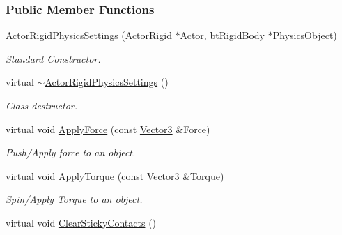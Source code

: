 \subsubsection*{Public Member Functions}
\begin{DoxyCompactItemize}
\item 
\hyperlink{classMezzanine_1_1ActorRigidPhysicsSettings_a01aac76583a043e4917546ab6fabe160}{Actor\-Rigid\-Physics\-Settings} (\hyperlink{classMezzanine_1_1ActorRigid}{Actor\-Rigid} $\ast$Actor, bt\-Rigid\-Body $\ast$Physics\-Object)
\begin{DoxyCompactList}\small\item\em Standard Constructor. \end{DoxyCompactList}\item 
virtual \hyperlink{classMezzanine_1_1ActorRigidPhysicsSettings_a56d106b78dfa0ea5415c7928491e4fa7}{$\sim$\-Actor\-Rigid\-Physics\-Settings} ()
\begin{DoxyCompactList}\small\item\em Class destructor. \end{DoxyCompactList}\item 
virtual void \hyperlink{classMezzanine_1_1ActorRigidPhysicsSettings_aafa276832f06cc6a72f8ff0b8ccea155}{Apply\-Force} (const \hyperlink{classMezzanine_1_1Vector3}{Vector3} \&Force)
\begin{DoxyCompactList}\small\item\em Push/\-Apply force to an object. \end{DoxyCompactList}\item 
virtual void \hyperlink{classMezzanine_1_1ActorRigidPhysicsSettings_a431d7e6e6f8a62d1ff626d2ccf5d7a6d}{Apply\-Torque} (const \hyperlink{classMezzanine_1_1Vector3}{Vector3} \&Torque)
\begin{DoxyCompactList}\small\item\em Spin/\-Apply Torque to an object. \end{DoxyCompactList}\item 
\hypertarget{classMezzanine_1_1ActorRigidPhysicsSettings_a6a5f7320087dc36d235ed9551bba193a}{virtual void \hyperlink{classMezzanine_1_1ActorRigidPhysicsSettings_a6a5f7320087dc36d235ed9551bba193a}{Clear\-Sticky\-Contacts} ()}\label{classMezzanine_1_1ActorRigidPhysicsSettings_a6a5f7320087dc36d235ed9551bba193a}


\end{DoxyCompactItemize}
